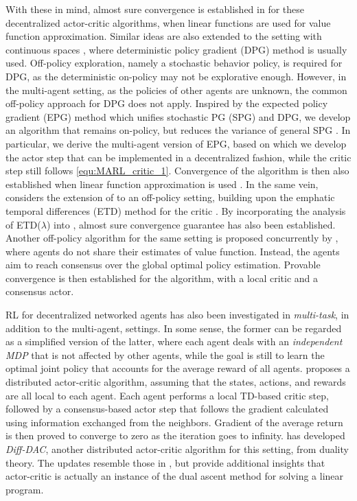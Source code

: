 With these in mind, almost sure convergence  is established    in \cite{zhang2018fully} for these decentralized actor-critic algorithms, when     linear functions are  used for value function approximation.  
Similar ideas are also extended to the setting with continuous spaces \cite{zhang18cdc}, where deterministic policy gradient (DPG) method  is usually used. Off-policy exploration, namely a stochastic behavior policy, is required  for DPG, as the deterministic on-policy may not be explorative enough. However, in the multi-agent setting, as the  policies of other agents are unknown, the common off-policy approach for DPG \cite[\S 4.2]{silver2014deterministic} does not apply. Inspired by the expected policy gradient (EPG) method \cite{ciosek2018expected} which unifies stochastic PG (SPG) and DPG, we develop an algorithm that remains on-policy, but reduces the variance of general SPG  \cite{zhang18cdc}. In particular, we derive the multi-agent version of EPG, based on which we  develop  the actor step that can be implemented in a decentralized fashion, while the critic step still follows  \eqref{equ:MARL_critic_1}. Convergence of the algorithm is then also established when linear function approximation is used \cite{zhang18cdc}. In the same vein, \cite{suttle2019multi} considers the extension of \cite{zhang2018fully} to an off-policy  setting, building upon the  emphatic temporal differences (ETD) method for the critic \cite{sutton2016emphatic}. By incorporating the analysis of ETD($\lambda$) \cite{yu2015convergence} into \cite{zhang2018fully}, almost sure convergence guarantee has also been established. Another off-policy algorithm for the same setting is proposed concurrently by  \cite{zhang2019distributed}, where agents do not share their estimates of value function. Instead, the agents aim to reach consensus over the global optimal policy estimation. Provable convergence is then established for the algorithm, with  a  local critic and a consensus actor.   


RL for decentralized networked agents has also been investigated in  \emph{multi-task}, in addition to the multi-agent, settings.  In some sense, the former can be regarded as a simplified version of the latter, where each agent deals with an \emph{independent MDP} that is not affected by other agents, while the goal is still to learn the  optimal joint policy that accounts for the average reward of all agents. 
\cite{pennesi2010distributed} proposes a distributed actor-critic algorithm,  assuming that the states, actions, and rewards are all local to each agent. Each agent performs a local TD-based critic step, followed by a consensus-based actor step that follows the gradient calculated using  information exchanged from the neighbors. Gradient of the average return is then proved to converge to zero as the iteration goes to infinity. \cite{macua2017diff} has  developed  \emph{Diff-DAC}, another distributed actor-critic algorithm for this setting, from duality theory. The updates resemble those  in \cite{zhang2018fully}, but provide additional insights that   actor-critic is  actually an instance of
the dual ascent method for solving  a linear program. 

